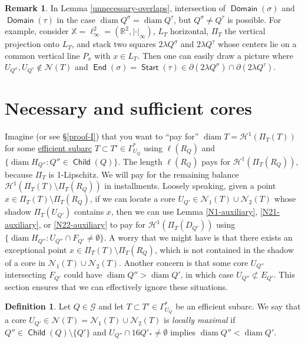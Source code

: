 \documentclass[12pt]{amsart}
\numberwithin{equation}{section}
\theoremstyle{plain}
\theoremstyle{definition}
\newtheorem{remark}[theorem]{Remark}
\newtheorem{definition}[theorem]{Definition}
\def\RR{\mathbb{R}}
\def\XX{{\mathbb{X}}}
\newcommand{\diam}{\mathop\mathrm{diam}\nolimits}
\newcommand{\Haus}{\mathcal{H}}
\newcommand{\Start}{\mathop\mathsf{Start}\nolimits}
\newcommand{\End}{\mathop\mathsf{End}\nolimits}
\newcommand{\Domain}{\mathop\mathsf{Domain}\nolimits}
\newcommand{\Child}{\mathop\mathsf{Child}\nolimits}
\numberwithin{figure}{section}
\begin{document}
\begin{remark} In Lemma \ref{unnecessary-overlaps}, intersection of $\Domain(\sigma)$ and $\Domain(\tau)$ in the case $\diam Q^\sigma=\diam Q^\tau$, but $Q^\sigma\neq Q^\tau$ is possible. For example, consider $\XX=\ell^2_\infty=(\RR^2,|\cdot|_\infty)$, $L_T$ horizontal, $\Pi_T$ the vertical projection onto $L_T$, and stack two squares $2\lambda Q^\sigma$ and $2\lambda Q^\tau$ whose centers lie on a common vertical line $P_x$ with $x\in L_T$. Then one can easily draw a picture where $U_{Q^\sigma},U_{Q^\tau}\not\in\mathcal{N}(T)$ and $\End(\sigma)=\Start(\tau)\in\partial(2\lambda Q^\sigma)\cap\partial (2\lambda Q^\tau)$.\end{remark}


\section{Necessary and sufficient cores}\label{sec: N'}

Imagine (or see \S\ref{proof-I}) that you want to ``pay for'' $\diam T=\Haus^1(\Pi_{T}(T))$ for some \hyperref[def:subarc]{efficient subarc} $T\subset T'\in\Gamma^*_{U_Q}$ using $\ell(R_Q)$ and $\{\diam H_{Q''}:Q''\in\Child(Q)\}$. The length $\ell(R_Q)$ pays for $\Haus^1(\Pi_T(R_Q))$, because $\Pi_T$ is 1-Lipschitz. We will pay for the remaining balance $\Haus^1(\Pi_T(T)\setminus\Pi_T(R_Q))$ in installments. Loosely speaking, given a point $x\in \Pi_{T}(T)\setminus \Pi_T(R_Q)$, if we can locate a core $U_{Q'}\in\mathcal{N}_1(T)\cup\mathcal{N}_2(T)$ whose shadow $\Pi_{T}(U_{Q'})$ contains $x$, then we can use Lemma \ref{N1-auxiliary}, \ref{N21-auxiliary}, or \ref{N22-auxiliary} to pay for $\Haus^1(\Pi_T(D_{Q'}))$ using $\{\diam H_{Q''}:U_{Q''}\cap F_{Q'}\neq\emptyset\}$. A worry that we might have is that there exists an exceptional point $x\in \Pi_T(T)\setminus \Pi_T(R_Q)$, which is not contained in the shadow of a core in $\mathcal{N}_1(T)\cup\mathcal{N}_2(T)$. Another concern is that some core $U_{Q''}$ intersecting $F_{Q'}$ could have $\diam Q''>\diam Q'$, in which case $U_{Q''}\not\subset E_{Q'}$. This section ensures that we can effectively ignore these situations.

\begin{definition}\label{def:locally-maximal} Let $Q\in\mathscr{G}$ and let $T\subset T'\in\Gamma^*_{U_Q}$ be an efficient subarc. We say that a core $U_{Q'}\in\mathcal{N}(T)=\mathcal{N}_1(T)\cup\mathcal{N}_2(T)$ is \emph{locally maximal} if $Q''\in\Child(Q)\setminus\{Q'\}$ and $U_{Q''}\cap 16Q'_*\neq\emptyset$ implies $\diam Q''<\diam Q'$.\end{definition}
\end{document}
